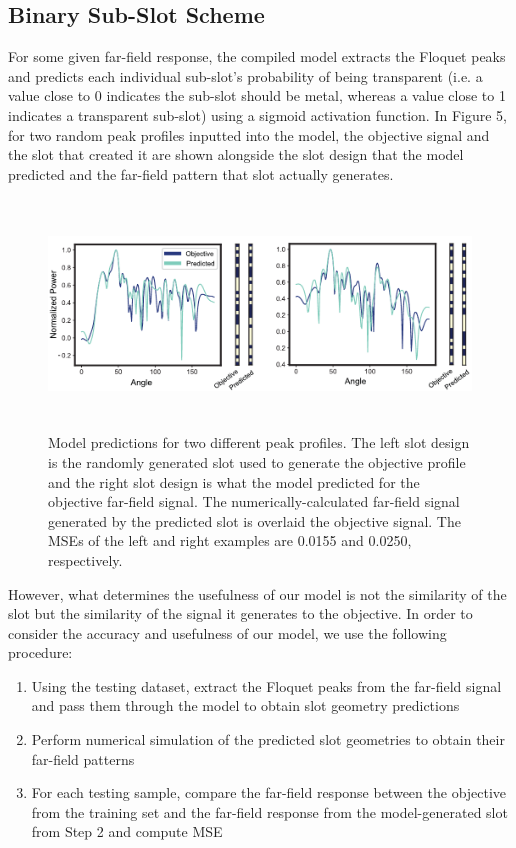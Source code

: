 \documentclass[11pt]{article}
\begin{document}
\subsection*{Binary Sub-Slot Scheme}

For some given far-field response, the compiled model extracts the Floquet peaks and predicts each individual sub-slot's probability of being transparent (i.e. a value close to 0 indicates the sub-slot should be metal, whereas a value close to 1 indicates a transparent sub-slot) using a sigmoid activation function. In Figure 5, for two random peak profiles inputted into the model, the objective signal and the slot that created it are shown alongside the slot design that the model predicted and the far-field pattern that slot actually generates.

\begin{figure}[H]
	\centering
	\includegraphics[height=2.4in]{figures/binaryexamples}
	\caption{Model predictions for two different peak profiles. The left slot design is the randomly generated slot used to generate the objective profile and the right slot design is what the model predicted for the objective far-field signal. The numerically-calculated far-field signal generated by the predicted slot is overlaid the objective signal. The MSEs of the left and right examples are 0.0155 and 0.0250, respectively.}
\end{figure}

\noindent However, what determines the usefulness of our model is not the similarity of the slot but the similarity of the signal it generates to the objective. In order to consider the accuracy and usefulness of our model, we use the following procedure:

\begin{enumerate}
	\item Using the testing dataset, extract the Floquet peaks from the far-field signal and pass them through the model to obtain slot geometry predictions
	\item Perform numerical simulation of the predicted slot geometries to obtain their far-field patterns
	\item For each testing sample, compare the far-field response between the objective from the training set and the far-field response from the model-generated slot from Step 2 and compute MSE
\end{enumerate}
\end{document}
